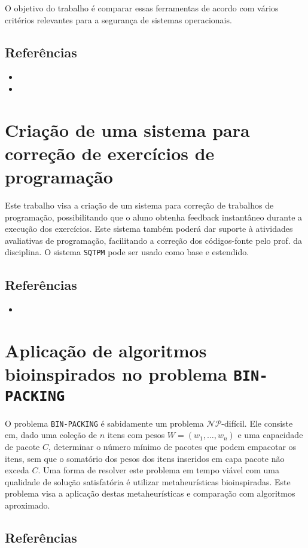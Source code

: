 \documentclass{article}
\newcommand*{\nsection}[1]{
    \section{#1}
}
\begin{document}
O objetivo do trabalho é comparar essas ferramentas de acordo com vários critérios relevantes para a segurança de sistemas operacionais.

\subsection{Referências}

\begin{itemize}
	\item {}
	\item {}
\end{itemize}

\nsection{Criação de uma sistema para correção de exercícios de programação}

Este trabalho visa a criação de um sistema para correção de trabalhos de programação, possibilitando que o aluno obtenha feedback instantâneo durante a execução dos exercícios. Este sistema também poderá dar suporte à atividades avaliativas de programação, facilitando a correção dos códigos-fonte pelo prof. da disciplina. O sistema {\tt SQTPM} pode ser usado como base e estendido.

\subsection{Referências}


\begin{itemize}
	\item {}
\end{itemize}

\nsection{Aplicação de algoritmos bioinspirados no problema {\tt BIN-PACKING}}

O problema {\tt BIN-PACKING} é sabidamente um problema $\mathcal{N\!P}$-difícil. Ele consiste em, dado uma coleção de $n$ itens com pesos $W=(w_1,\ldots,w_n)$ e uma capacidade de pacote $C$, determinar o número mínimo de pacotes que podem empacotar os itens, sem que o somatório dos pesos dos itens inseridos em capa pacote não exceda $C$. Uma forma de resolver este problema em tempo viável com uma qualidade de solução satisfatória é utilizar metaheurísticas bioinspiradas. Este problema visa a aplicação destas metaheurísticas e comparação com algoritmos aproximado.

\subsection{Referências}
\end{document}
